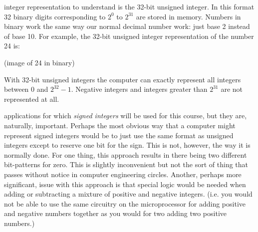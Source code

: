  integer representation to understand is the 32-bit unsigned integer. In this format 32 binary digits corresponding to $2^0$ to $2^{31}$ are stored in memory.  Numbers in binary work the same way our normal decimal number work: just base 2 instead of base 10.  For example, the 32-bit unsigned integer representation of the number 24 is:

\vspace{0.25cm}
\noindent (image of 24 in binary)
\vspace{0.25cm}

With 32-bit unsigned integers the computer can exactly represent all integers between 0 and $2^{32}-1$. Negative integers and integers greater than $2^{31}$ are not represented at all.%




 applications for which \emph{signed integers} will be used for this course, but they are, naturally, important.  Perhaps the most obvious way that a computer might represent signed integers would be to just use the same format as unsigned integers except to reserve one bit for the sign.  This is not, however, the way it is normally done.  For one thing, this approach results in there being two different bit-patterns for zero.  This is slightly inconvenient but not the sort of thing that passes without notice in computer engineering circles. Another, perhaps more significant, issue with this approach is that special logic would be needed when adding or subtracting a mixture of positive and negative integers. (i.e. you would not be able to use the same circuitry on the microprocessor for adding positive and negative numbers together as you would for two adding two positive numbers.)
  
